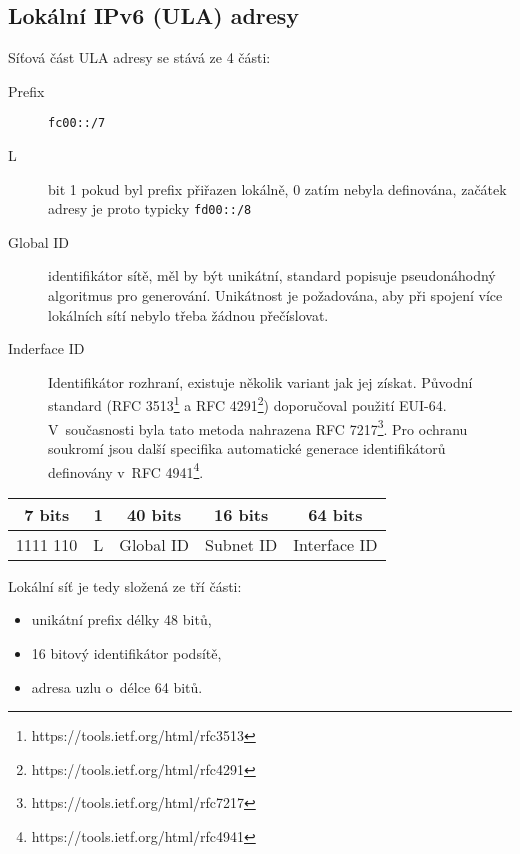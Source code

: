 \subsection{Lokální IPv6 (ULA) adresy}\label{ula}
Síťová část ULA adresy se stává ze 4 části:
\begin{description}
    \item [Prefix] {\tt fc00::/7}
    \item [L] bit 1 pokud byl prefix přiřazen lokálně, 0 zatím nebyla
        definována, začátek adresy je proto typicky {\tt fd00::/8}
    \item [Global ID] identifikátor sítě, měl by být unikátní, standard
        popisuje pseudonáhodný algoritmus pro generování. Unikátnost je
        požadována, aby při spojení více lokálních sítí nebylo třeba žádnou
        přečíslovat.
    \item [Inderface ID] Identifikátor rozhraní, existuje několik variant jak
        jej získat. Původní standard (RFC
        3513\footnote{https://tools.ietf.org/html/rfc3513} a RFC
        4291\footnote{https://tools.ietf.org/html/rfc4291}) doporučoval použití
        EUI-64. V~současnosti byla tato metoda nahrazena RFC
        7217\footnote{https://tools.ietf.org/html/rfc7217}. Pro ochranu
        soukromí jsou další specifika automatické generace identifikátorů
        definovány v~RFC 4941\footnote{https://tools.ietf.org/html/rfc4941}.
\end{description}

\begin{table}[ht!]
    \begin{center}
        \begin{tabular}{c|c|c|c|c}
            7 bits & 1 &  40 bits  &  16 bits  & 64 bits \\
            \hline
            1111 110 & L & Global ID & Subnet ID & Interface ID \\
            \hline
        \end{tabular}
    \end{center}
\end{table}

Lokální síť je tedy složená ze tří části:
\begin{itemize}
    \item unikátní prefix délky 48 bitů,
    \item 16 bitový identifikátor podsítě,
    \item adresa uzlu o~délce 64 bitů.
\end{itemize}

